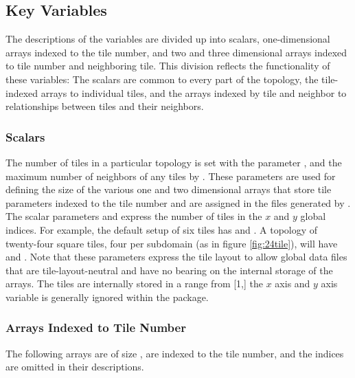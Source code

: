 \subsection{Key Variables}

The descriptions of the variables are divided up into scalars,
one-dimensional arrays indexed to the tile number, and two and three
dimensional arrays indexed to tile number and neighboring tile.  This
division reflects the functionality of these variables: The
scalars are common to every part of the topology, the tile-indexed
arrays to individual tiles, and the arrays indexed by tile and
neighbor to relationships between tiles and their neighbors. \\

\subsubsection{Scalars}

The number of tiles in a particular topology is set with the parameter
, and the maximum number of neighbors of any tiles by
.  These parameters are used for defining the
size of the various one and two dimensional arrays that store tile
parameters indexed to the tile number and are assigned in the files
generated by .\\

The scalar parameters 
and  express the number
of tiles in the $x$ and $y$ global indices.  For example, the default
setup of six tiles has  and
.  A topology of twenty-four square tiles,
four per subdomain (as in figure \ref{fig:24tile}), will have
 and .  Note
that these parameters express the tile layout to allow global data
files that are tile-layout-neutral and have no bearing on the internal
storage of the arrays.  The tiles are internally stored in a range
from [1,] the $x$ axis and $y$ axis variable
 is generally ignored within the package. \\

\subsubsection{Arrays Indexed to Tile Number}

The following arrays are of size , are indexed to the
tile number, and the indices are omitted in their descriptions. \\

